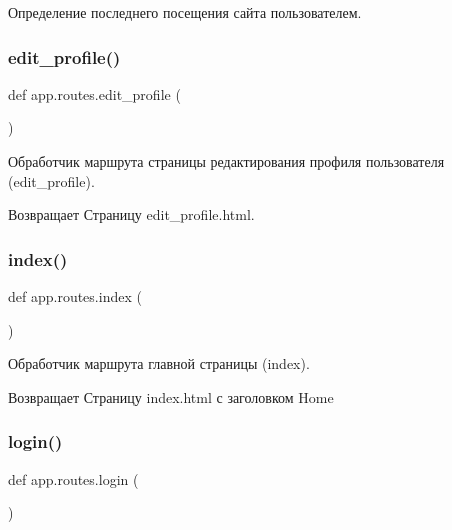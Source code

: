 Определение последнего посещения сайта пользователем. 

\mbox{\label{namespaceapp_1_1routes_a47169dd03493dd1713ce2678b0bda4a7}} 
\subsubsection{\texorpdfstring{edit\+\_\+profile()}{edit\_profile()}}
{\footnotesize\ttfamily def app.\+routes.\+edit\+\_\+profile (\begin{DoxyParamCaption}{ }\end{DoxyParamCaption})}



Обработчик маршрута страницы редактирования профиля пользователя (edit\+\_\+profile). 

\begin{DoxyReturn}{Возвращает}
Страницу edit\+\_\+profile.\+html. 
\end{DoxyReturn}
\mbox{\label{namespaceapp_1_1routes_a724739005fa07eb8591ce53b0daf3dc1}} 
\subsubsection{\texorpdfstring{index()}{index()}}
{\footnotesize\ttfamily def app.\+routes.\+index (\begin{DoxyParamCaption}{ }\end{DoxyParamCaption})}



Обработчик маршрута главной страницы (index). 

\begin{DoxyReturn}{Возвращает}
Страницу index.\+html с заголовком Home 
\end{DoxyReturn}
\mbox{\label{namespaceapp_1_1routes_a55242b1fcb58ff44c5b793cbb5335272}} 
\subsubsection{\texorpdfstring{login()}{login()}}
{\footnotesize\ttfamily def app.\+routes.\+login (\begin{DoxyParamCaption}{ }\end{DoxyParamCaption})}



